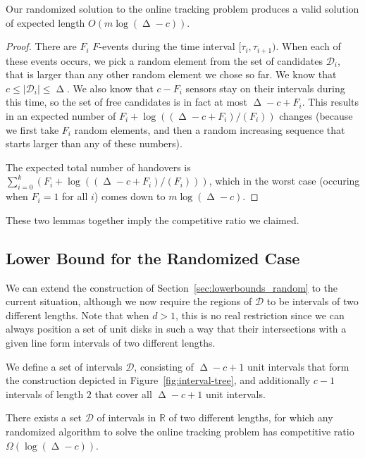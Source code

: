 \documentclass[runningheads]{llncs}
\newcommand {\mathset} [1] {\ensuremath {\mathbb {#1}}}
\newcommand {\R} {\mathset {R}}
\newcommand {\script} [1] {\ensuremath {\mathcal {#1}}}
\DeclareMathOperator {\ply}{\Delta}
\newcommand{\marrow}{\marginpar[\hfill$\longrightarrow$]{$\longleftarrow$}}
\renewcommand{\remark}[3]{\textcolor{blue}{\textsc{#1 #2:}}
\textcolor{red}{\marrow\textsf{#3}}}
\renewcommand{\remark}[3]{\relax}
\newcommand{\maarten}[2][says]{\remark{Maarten}{#1}{#2}}
\begin{document}
    \begin {lemma}
      Our randomized solution to the online tracking problem produces a valid solution of expected length $O(m \log (\ply - c))$.
    \end {lemma}

    \begin {proof}
      There are $F_i$ $F$-events during the time interval $[\tau_i, \tau_{i+1})$. When each of these events occurs, we pick a random element from the set of candidates $\script D_i$, that is larger than any other random element we chose so far. We know that $c \leq |\script D_i| \leq \ply$. We also know that $c - F_i$ sensors stay on their intervals during this time, so the set of free candidates is in fact at most $\ply - c + F_i$.
      This results in an expected number of $F_i + \log ((\ply - c + F_i)/(F_i))$ changes (because we first take $F_i$ random elements, and then a random increasing sequence that starts larger than any of these numbers). 

      The expected total number of handovers is $\sum_{i=0}^k (F_i + \log ((\ply - c + F_i)/(F_i)))$, which in the worst case (occuring when $F_i = 1$ for all $i$) comes down to $m \log (\ply - c)$.
    \end {proof}      

    These two lemmas together imply the competitive ratio we claimed.

    \maarten {The other algorithms are easier anyway, so they probably also generalize.}

  \subsection {Lower Bound for the Randomized Case}
    We can extend the construction of Section~\ref {sec:lowerbounds_random} to the current situation, although we now require the regions of $\script D$ to be intervals of two different lengths. Note that when $d > 1$, this is no real restriction since we can always position a set of unit disks in such a way that their intersections with a given line form intervals of two different lengths.
    
    We define a set of intervals $\script D$, consisting of $\ply - c + 1$ unit intervals that form the construction depicted in Figure~\ref {fig:interval-tree}, and additionally $c - 1$ intervals of length $2$ that cover all $\ply - c + 1$ unit intervals.
    
\begin {theorem} \label {thm:trilateration-lowerbound}
  There exists a set $\script D$ of intervals in $\R$ of two different lengths, for which any randomized algorithm to solve the online tracking problem has competitive ratio $\Omega (\log (\ply - c))$.
\end {theorem}
\end{document}
